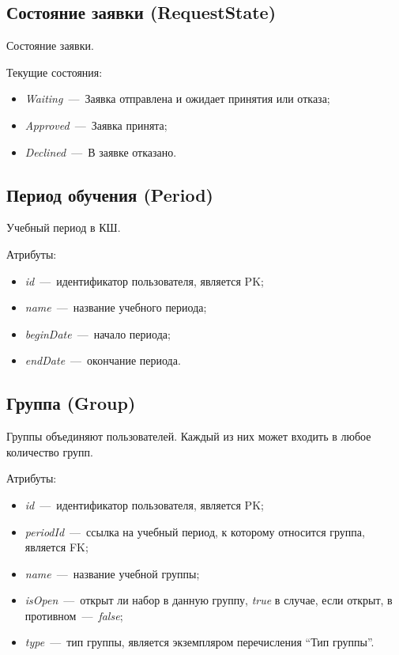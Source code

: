 \documentclass[14pt]{article}
\begin{document}
\subsection{Состояние заявки (RequestState)}

Состояние заявки.

Текущие состояния:
\begin{itemize}
	\item \emph{Waiting}~---~Заявка отправлена и ожидает принятия или отказа;
	\item \emph{Approved}~---~Заявка принята;
	\item \emph{Declined}~---~В заявке отказано.
\end{itemize}

\subsection{Период обучения (Period)}

Учебный период в КШ.

Атрибуты:
\begin{itemize}
	\item \emph{id}~---~идентификатор пользователя, является PK;
	\item \emph{name}~---~название учебного периода;
	\item \emph{beginDate}~---~начало периода;
	\item \emph{endDate}~---~окончание периода.
\end{itemize}

\subsection{Группа (Group)}

Группы объединяют пользователей. Каждый из них может входить в любое количество групп.

Атрибуты:
\begin{itemize}
	\item \emph{id}~---~идентификатор пользователя, является PK;
	\item \emph{periodId}~---~ссылка на учебный период, к которому относится группа, является FK;
	\item \emph{name}~---~название учебной группы;
	\item \emph{isOpen}~---~открыт ли набор в данную группу, \emph{true} в случае, если открыт, в противном~---~\emph{false};
	\item \emph{type}~---~тип группы, является экземпляром перечисления ``Тип группы''.
\end{itemize}
\end{document}
